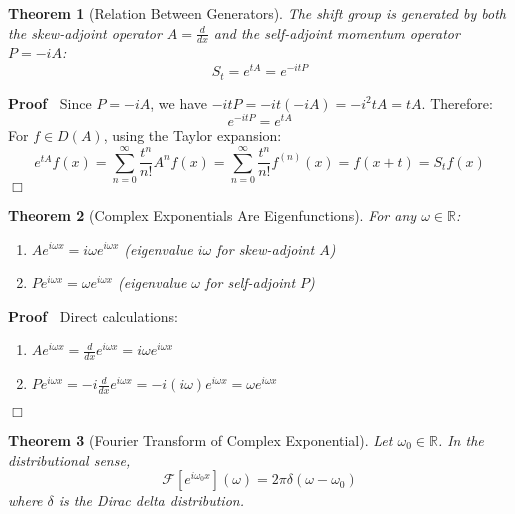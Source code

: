 \documentclass{article}
\newenvironment{proof}{\noindent\textbf{Proof\ }}{\hspace*{\fill}$\Box$\medskip}
\newtheorem{theorem}{Theorem}
\begin{document}
\begin{theorem}
  [Relation Between Generators] The shift group is generated by both the
  skew-adjoint operator $A = \frac{d}{dx}$ and the self-adjoint momentum
  operator $P = - iA$:
  \[ S_t = e^{tA} = e^{- itP} \]
\end{theorem}

\begin{proof}
  Since $P = - iA$, we have $- itP = - it (- iA) = - i^2 tA = tA$. Therefore:
  \[ e^{- itP} = e^{tA} \]
  For $f \in D (A)$, using the Taylor expansion:
  \[ e^{tA} f (x) = \sum_{n = 0}^{\infty} \frac{t^n}{n!} A^n f (x) = \sum_{n =
     0}^{\infty} \frac{t^n}{n!} f^{(n)} (x) = f (x + t) = S_t f (x) \]
\end{proof}

\begin{theorem}
  [Complex Exponentials Are Eigenfunctions] For any $\omega \in \mathbb{R}$:
  \begin{enumerate}
    \item $Ae^{i \omega x} = i \omega e^{i \omega x}$ (eigenvalue $i \omega$
    for skew-adjoint $A$)
    
    \item $Pe^{i \omega x} = \omega e^{i \omega x}$ (eigenvalue $\omega$ for
    self-adjoint $P$)
  \end{enumerate}
\end{theorem}

\begin{proof}
  Direct calculations:
  \begin{enumerate}
    \item $Ae^{i \omega x} = \frac{d}{dx} e^{i \omega x} = i \omega e^{i
    \omega x}$
    
    \item $Pe^{i \omega x} = - i \frac{d}{dx} e^{i \omega x} = - i (i \omega)
    e^{i \omega x} = \omega e^{i \omega x}$
  \end{enumerate}
\end{proof}

\begin{theorem}
  [Fourier Transform of Complex Exponential] Let $\omega_0 \in \mathbb{R}$. In
  the distributional sense,
  \[ \mathcal{F} [e^{i \omega_0 x}] (\omega) = 2 \pi \delta (\omega -
     \omega_0) \]
  where $\delta$ is the Dirac delta distribution.
\end{theorem}
\end{document}
